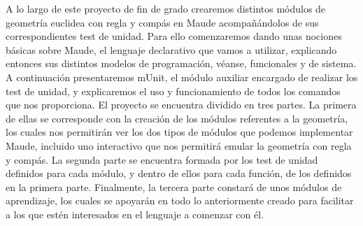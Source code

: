 
A lo largo de este proyecto de fin de grado crearemos distintos módulos de geometría euclidea con regla y compás en Maude acompañándolos de sus correspondientes test de unidad. Para ello comenzaremos dando unas nociones básicas sobre Maude, el lenguaje declarativo que vamos a utilizar, explicando entonces sus distintos modelos de programación, véanse, funcionales y de sistema. A continuación presentaremos mUnit, el módulo auxiliar encargado de realizar los test de unidad, y explicaremos el uso y funcionamiento de todos los comandos que nos proporciona. El proyecto se encuentra dividido en tres partes. La primera de ellas se corresponde con la creación de los módulos referentes a la geometría, los cuales nos permitirán ver los dos tipos de módulos que podemos implementar Maude, incluido uno interactivo que nos permitirá emular la geometría con regla y compás. La segunda parte se encuentra formada por los test de unidad definidos para cada módulo, y dentro de ellos para cada función, de los definidos en la primera parte. Finalmente, la tercera parte constará de unos módulos de aprendizaje, los cuales se apoyarán en todo lo anteriormente creado para facilitar a los que estén interesados en el lenguaje a comenzar con él. 
